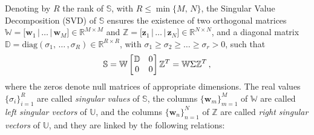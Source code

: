 \documentclass[12pt, a4paper, twoside, openright]{report}
\numberwithin{equation}{chapter}
\theoremstyle{theorem}
\theoremstyle{definition}
\theoremstyle{remark}
\theoremstyle{proposition}
\numberwithin{figure}{chapter}
\begin{document}
		Denoting by $R$ the rank of $\mathbb{S}$, with $R \leq \min \big\lbrace{ M, \, N \big\rbrace}$, the Singular Value Decomposition (SVD) of $\mathbb{S}$ ensures the existence of two orthogonal matrices $\mathbb{W} = \big[ \mathbf{w}_1 \, \big| \, \ldots \, \big| \, \mathbf{w}_M \big] \in \mathbb{R}^{M \times M}$ and $\mathbb{Z} = \big[ \mathbf{z}_1 \, \big| \, \ldots \, \big| \, \mathbf{z}_N \big] \in \mathbb{R}^{N \times N}$, and a diagonal matrix $\mathbb{D} = \text{diag}(\sigma_1, \, \ldots \, , \sigma_R) \in \mathbb{R}^{R \times R}$, with $\sigma_1 \geq \sigma_2 \geq \ldots \geq \sigma_r > 0$, such that
		\begin{equation}
			\label{eq:svd}
			\mathbb{S} = \mathbb{W} 
			\begin{bmatrix}
			\hspace*{-0.15cm}
			\begin{array}{cc}
				\mathbb{D} & 0 \\
				0 & 0
			\end{array} 
			\hspace*{-0.15cm}
			\end{bmatrix}
			\mathbb{Z}^T = \mathbb{W} \Sigma \mathbb{Z}^T \, ,
		\end{equation}
		where the zeros denote null matrices of appropriate dimensions. The real values $\big\lbrace \sigma_i \big\rbrace_{i = 1}^R$ are called \emph{singular values} of $\mathbb{S}$, the columns $\big\lbrace \mathbf{w}_m \big\rbrace_{m = 1}^M$ of $\mathbb{W}$ are called \emph{left singular vectors} of $\mathbb{U}$, and the columns $\big\lbrace \mathbf{w}_n \big\rbrace_{n = 1}^N$ of $\mathbb{Z}$ are called \emph{right singular vectors} of $\mathbb{U}$, and they are linked by the following relations:
\end{document}
